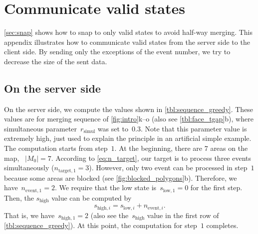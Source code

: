\documentclass[twocolumn]{svjour3}          %
\begin{document}
\bigskip


\section{Communicate valid states}
\label{appx:communicate_valid_states}

\sect\ref{sec:snap} shows how to snap to only valid states 
to avoid half-way merging.
This appendix illustrates how to communicate valid states 
from the server side to the client side.
By sending only the exceptions of the event number, 
we try to decrease the size of the sent data.



\subsection{On the server side}
\label{sec:communicate_server}

On the server side, 
we compute the values shown in \tabl\ref{tbl:sequence_greedy}.
These values are for merging sequence of \fig\ref{fig:intro}k--o 
(also see \tabl\ref{tbl:face_tgap}b),
where simultaneous parameter~$r_\mathrm{simul}$ was set to~$0.3$.
Note that this parameter value is extremely high, 
just used to explain the principle in an artificial simple example.
The computation starts from step~$1$.
At the beginning, there are $7$ areas on the map, \ie~$|M_0| = 7$.
According to \eq\ref{eq:n_target},
our target is to process three events simultaneously ($n_{\mathrm{target},1} = 3$).
However, only two event can be processed in step~$1$ 
because some areas are blocked
(see \fig\ref{fig:blocked_polygons}b).
Therefore, we have~$n_{\mathrm{event},1} = 2$.
We require that the low state is~$s_{\mathrm{low},1} = 0$ for the first step.
Then, the $s_\mathrm{high}$ value can be computed by
\begin{equation}
\label{eq:state_high}
s_{\mathrm{high},i} = s_{\mathrm{low},i} + n_{\mathrm{event},i}.
\end{equation}
That is, we have~$s_{\mathrm{high},1}=2$
(also see the~$s_\mathrm{high}$ value in the first row of \tabl\ref{tbl:sequence_greedy}).
At this point, the computation for step~$1$ completes.
\end{document}
